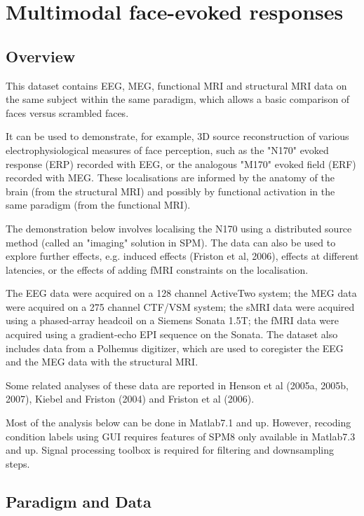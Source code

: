 \chapter{Multimodal face-evoked responses \label{Chap:data:multimodal}}


\section{Overview}

This dataset contains EEG, MEG, functional MRI and structural MRI data on the same subject within the same paradigm, which allows a basic comparison of faces versus scrambled faces.

It can be used to demonstrate, for example, 3D source reconstruction of various electrophysiological measures of face perception, such as the "N170" evoked response (ERP) recorded with EEG, or the analogous "M170" evoked field (ERF) recorded with MEG. These localisations are informed by the anatomy of the brain (from the structural MRI) and possibly by functional activation in the same paradigm (from the functional MRI).

The demonstration below involves localising the N170 using a distributed source method (called an "imaging" solution in SPM). The data can also be used to explore further effects, e.g. induced effects (Friston et al, 2006), effects at different latencies, or the effects of adding fMRI constraints on the localisation.

The EEG data were acquired on a 128 channel ActiveTwo system; the MEG data were acquired on a 275 channel CTF/VSM system; the sMRI data were acquired using a phased-array headcoil on a Siemens Sonata 1.5T; the fMRI data were acquired using a gradient-echo EPI sequence on the Sonata. The dataset also includes data from a Polhemus digitizer, which are used to coregister the EEG and the MEG data with the structural MRI.

Some related analyses of these data are reported in Henson et al (2005a, 2005b, 2007), Kiebel and Friston (2004) and Friston et al (2006).

Most of the analysis below can be done in Matlab7.1 and up. However, recoding condition labels using GUI requires features of SPM8 only available in Matlab7.3 and up. Signal processing toolbox is required for filtering and downsampling steps. 

\section{Paradigm and Data}

